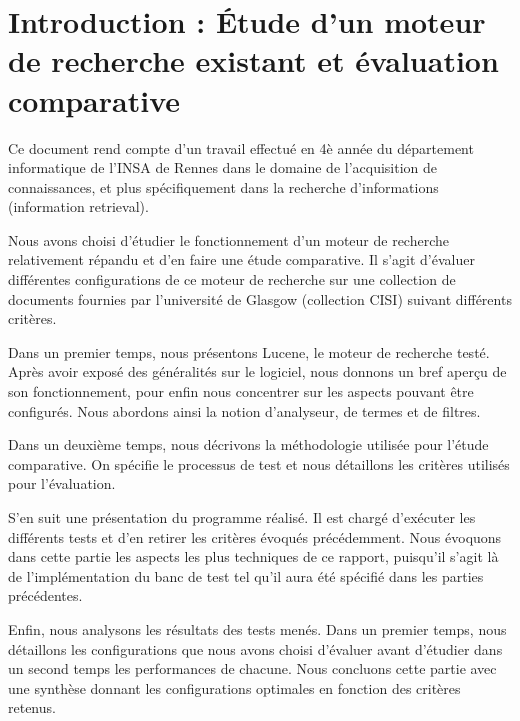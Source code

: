 \section{Introduction : Étude d’un moteur de recherche existant et évaluation comparative}

Ce document rend compte d’un travail effectué en 4è année du département informatique de l’INSA de Rennes dans le domaine de l’acquisition de connaissances, et plus spécifiquement dans la recherche d’informations (information retrieval).

Nous avons choisi d’étudier le fonctionnement d’un moteur de recherche relativement répandu et d’en faire une étude comparative. Il s’agit d’évaluer différentes configurations de ce moteur de recherche sur une collection de documents fournies par l’université de Glasgow (collection CISI) suivant différents critères.

Dans un premier temps, nous présentons Lucene, le moteur de recherche testé. Après avoir exposé des généralités sur le logiciel, nous donnons un bref aperçu de son fonctionnement, pour enfin nous concentrer sur les aspects pouvant être configurés. Nous abordons ainsi la notion d’analyseur, de termes et de filtres.

Dans un deuxième temps, nous décrivons la méthodologie utilisée pour l’étude comparative. On spécifie le processus de test et nous détaillons les critères utilisés pour l’évaluation.

S’en suit une présentation du programme réalisé. Il est chargé d’exécuter les différents tests et d’en retirer les critères évoqués précédemment. Nous évoquons dans cette partie les aspects les plus techniques de ce rapport, puisqu’il s’agit là de l’implémentation du banc de test tel qu’il aura été spécifié dans les parties précédentes.

Enfin, nous analysons les résultats des tests menés. Dans un premier temps, nous détaillons les configurations que nous avons choisi d’évaluer avant d’étudier dans un second temps les performances de chacune. Nous concluons cette partie avec une synthèse donnant les configurations optimales en fonction des critères retenus.

























